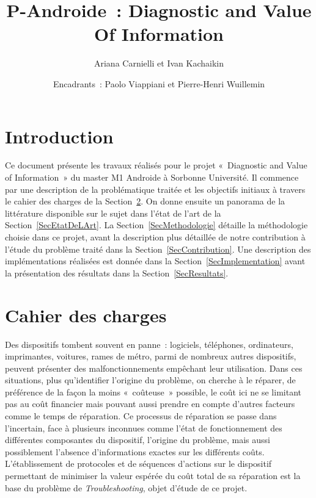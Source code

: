 \documentclass[a4paper,11pt]{article}
\theoremstyle{plain}
\theoremstyle{definition}
\begin{document}


\pagestyle{plain}

\title{P-Androide~: Diagnostic and Value Of Information}
\author{Ariana Carnielli et Ivan Kachaikin}
\date{Encadrants~: Paolo Viappiani et Pierre-Henri Wuillemin}
\maketitle

\tableofcontents


\section{Introduction}

Ce document présente les travaux réalisés pour le projet «~Diagnostic and Value of Information~» du master M1 Androide à Sorbonne Université. Il commence par une description de la problématique traitée et les objectifs initiaux à travers le cahier des charges de la Section~\ref{SecCharges}. On donne ensuite un panorama de la littérature disponible sur le sujet dans l'état de l'art de la Section~\ref{SecEtatDeLArt}. La Section~\ref{SecMethodologie} détaille la méthodologie choisie dans ce projet, avant la description plus détaillée de notre contribution à l'étude du problème traité dans la Section~\ref{SecContribution}. Une description des implémentations réalisées est donnée dans la Section~\ref{SecImplementation} avant la présentation des résultats dans la Section~\ref{SecResultats}.

\section{Cahier des charges}
\label{SecCharges}

Des dispositifs tombent souvent en panne~: logiciels, téléphones, ordinateurs, imprimantes, voitures, rames de métro, parmi de nombreux autres dispositifs, peuvent présenter des malfonctionnements empêchant leur utilisation. Dans ces situations, plus qu'identifier l'origine du problème, on cherche à le réparer, de préférence de la façon la moins «~coûteuse~» possible, le coût ici ne se limitant pas au coût financier mais pouvant aussi prendre en compte d'autres facteurs comme le temps de réparation. Ce processus de réparation se passe dans l'incertain, face à plusieurs inconnues comme l'état de fonctionnement des différentes composantes du dispositif, l'origine du problème, mais aussi possiblement l'absence d'informations exactes sur les différents coûts. L'établissement de protocoles et de séquences d'actions sur le dispositif permettant de minimiser la valeur espérée du coût total de sa réparation est la base du problème de \emph{Troubleshooting}, objet d'étude de ce projet.
\end{document}
